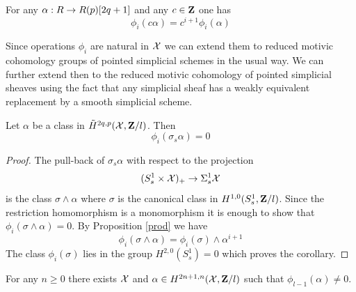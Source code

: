 \documentclass[11pt]{article}
\begin{document}
%
\begin{cor}
For any $\alpha:R\rightarrow R(p)[2q+1]$ and any $c\in{\bf Z\rm}$ one has
%
$$\phi_{i}(c\alpha)=c^{i+1}\phi_i(\alpha)$$
%
\end{cor}
%
Since operations $\phi_i$ are natural in $\cal X$ we can extend them
to reduced motivic cohomology groups of pointed simplicial schemes in
the usual way. We can further extend then to the reduced motivic
cohomology of pointed simplicial sheaves using the fact that any
simplicial sheaf has a weakly equivalent replacement by a smooth
simplicial scheme.
%
\begin{cor}
Let $\alpha$ be a class in $\tilde{H}^{2q,p}({\cal X},{\bf Z\rm}/l)$. Then
%
$$\phi_i(\sigma_s\alpha)=0$$
%
\end{cor}
%
\begin{proof}
The pull-back of $\sigma_s\alpha$ with respect to the projection
%
$$(S^1_s\times{\cal X})_+\rightarrow \Sigma^1_s{\cal X}$$
%
is the class $\sigma\wedge \alpha$ where $\sigma$ is the canonical
class in $H^{1,0}(S^1_s,{\bf Z\rm}/l)$. Since the restriction homomorphism is
a monomorphism it is enough to show that $\phi_{i}(\sigma\wedge
\alpha)=0$. By Proposition \ref{prod} we have
%
$$\phi_{i}(\sigma\wedge \alpha)=\phi_{i}(\sigma)\wedge \alpha^{i+1}$$
%
%
The class $\phi_{i}(\sigma)$ lies in the group $H^{2,0}(S^1_s)=0$
which proves the corollary.
\end{proof}
%
\begin{lemma}
For any $n\ge 0$ there exists $\cal X$ and $\alpha\in H^{2n+1,n}({\cal
X},{\bf Z\rm}/l)$ such that $\phi_{l-1}(\alpha)\ne 0$.
\end{lemma}
%
\end{document}
